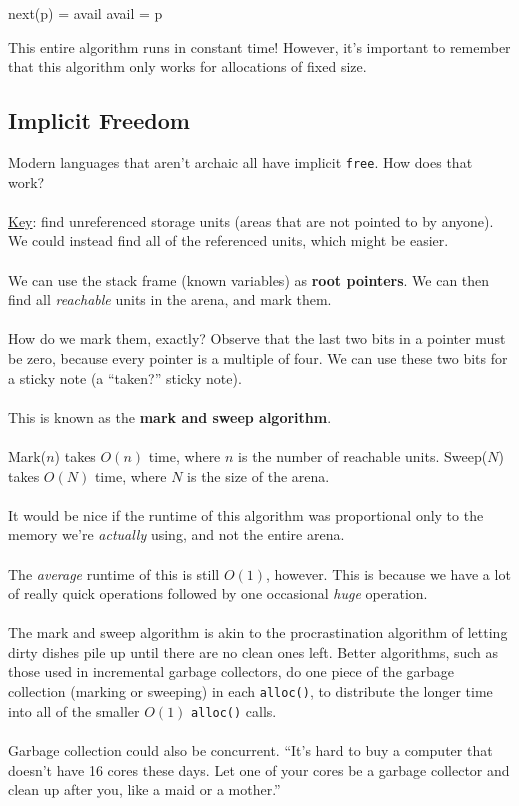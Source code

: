 \documentclass[]{article}
\theoremstyle{definition}
\begin{document}
			\begin{algorithm}[H]
				next(p) = avail\;
				avail = p\;
			\end{algorithm}

			This entire algorithm runs in constant time! However, it's important to remember that this algorithm only works for allocations of fixed size.
		
		\subsection{Implicit Freedom}
			Modern languages that aren't archaic all have implicit \verb+free+. How does that work?
			\\ \\
			\underline{Key}: find unreferenced storage units (areas that are not pointed to by anyone). We could instead find all of the referenced units, which might be easier.
			\\ \\
			We can use the stack frame (known variables) as \textbf{root pointers}. We can then find all \emph{reachable} units in the arena, and mark them.
			\\ \\
			How do we mark them, exactly? Observe that the last two bits in a pointer must be zero, because every pointer is a multiple of four. We can use these two bits for a sticky note (a ``taken?'' sticky note).
			\\ \\
			This is known as the \textbf{mark and sweep algorithm}.
			\\ \\
			Mark($n$) takes $O(n)$ time, where $n$ is the number of reachable units. Sweep($N$) takes $O(N)$ time, where $N$ is the size of the arena.
			\\ \\
			It would be nice if the runtime of this algorithm was proportional only to the memory we're \emph{actually} using, and not the entire arena.
			\\ \\
			The \emph{average} runtime of this is still $O(1)$, however. This is because we have a lot of really quick operations followed by one occasional \emph{huge} operation.
			\\ \\
			The mark and sweep algorithm is akin to the procrastination algorithm of letting dirty dishes pile up until there are no clean ones left. Better algorithms, such as those used in incremental garbage collectors, do one piece of the garbage collection (marking or sweeping) in each \verb+alloc()+, to distribute the longer time into all of the smaller $O(1)$ \verb+alloc()+ calls.
			\\ \\
			Garbage collection could also be concurrent. ``It's hard to buy a computer that doesn't have 16 cores these days. Let one of your cores be a garbage collector and clean up after you, like a maid or a mother.''
\end{document}
